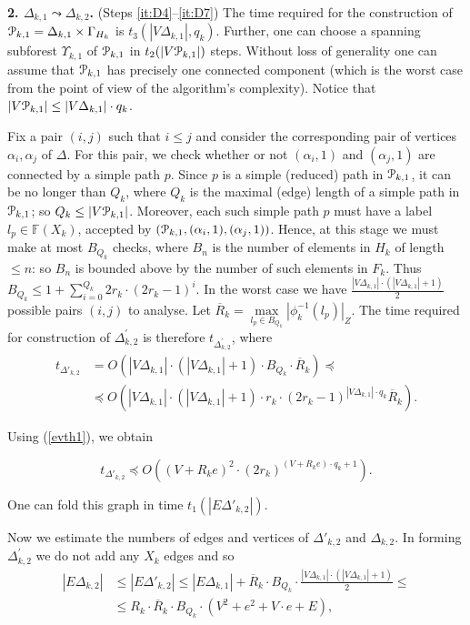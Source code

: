 \documentclass[a4paper,12pt]{article}
\renewcommand{\a}{\alpha }
\newcommand{\G}{\Gamma }
\newcommand{\D}{\Delta }
\newcommand{\U}{\Upsilon }
\newcommand{\cP}{{\cal{P}}}
\numberwithin{equation}{section}
\numberwithin{figure}{section}
\newcommand{\FF}{\ensuremath{\mathbb{F}}}
\begin{document}
{\bf 2. $\D_{k,1} \leadsto \D_{k,2}$.}  (Steps \ref{it:D4}--\ref{it:D7}) The time required for the
construction of $\cP_{k,1}=\D_{k,1}\times \G_{H_k}$ is $t_3(|V \D_{k,1}|, q_k)$.
Further, one can choose a spanning subforest $\U_{k,1}$ of $\cP_{k,1}$ in
$t_2(|V\cP_{k,1}|)$ steps. Without loss of generality one can assume
that $\cP_{k,1}$ has precisely one connected component (which is the
worst case from the point of view of the algorithm's complexity).
Notice that $|V\cP_{k,1}| \le |V\D_{k,1}|\cdot q_k$.


Fix a pair $(i, j)$ such that $i \le j$ and consider the
corresponding pair of vertices $\a_i,\a_j$ of $\D$. For this pair, we check
whether or not $(\a_i,1)$ and $(\a_j,1)$ are
connected by a  simple path $p$.
Since $p$ is a
simple (reduced) path in $\cP_{k,1}$, it can be no longer than $Q_k$,
where $Q_k$ is the maximal (edge) length of a simple path in $\cP_{k,1}$;
so $Q_k \le |V\cP_{k,1}|$.
Moreover, each such  simple path $p$ must have a label $l_p \in \FF(X_k)$,
accepted by $(\cP_{k,1},(\a_i,1),(\a_j,1))$. Hence, at
 this stage we must make
at most $B_{Q_k}$ checks, where $B_n$ is the number of elements in
$H_k$ of length $\le n$: so $B_{n}$ is bounded above by the number
of such elements in $F_k$. Thus $B_{Q_k} \le 1+
\mathop{\sum}\limits_{i=0}^{Q_k} 2 r_k \cdot (2r_k-1)^{i}$. In the
worst case we have $\frac{|V\D_{k,1}|\cdot(|V\D_{k,1}|+1)}{2}$ possible
pairs $(i,j)$ to analyse. Let $\overline{R}_k=\max\limits_{l_p \in
B_{Q_k}}|\phi^{-1}_k(l_p)|_Z$.
 The time required for construction of $\D_{k,2}^\prime$ is therefore $t_{\D_{k,2}^\prime}$,
where
\begin{equation}\label{pretheta'2}
\begin{split}
t_{\D'_{k,2}} &= O(|V\D_{k,1}|\cdot(|V\D_{k,1}|+1)\cdot B_{Q_k}
\cdot \overline{R}_k)\preceq\\
&\preceq O(|V\D_{k,1}|\cdot(|V\D_{k,1}|+1)\cdot r_k \cdot
(2r_k-1)^{|V\D_{k,1}|\cdot q_k}\overline{R}_k).
\end{split}
\end{equation}

Using (\ref{evth1}), we obtain

\begin{equation}\label{theta'2}
t_{\D'_{k,2}} \preceq O((V + R_k e)^2\cdot (2r_k)^{(V +
R_k e)\cdot q_k +1}).
\end{equation}

One can fold this graph in time $t_1(|E\D'_{k,2}|)$.

Now we estimate the numbers of edges  and vertices  of $\D'_{k,2}$ and
$\D_{k,2}$. In forming $\D_{k,2}^\prime$  we do not add any $X_k$ edges
and so
\begin{equation}\label{etheta2}
\begin{split}
|E\D_{k,2}| &\le |E\D'_{k,2}| \le |E\D_{k,1}|+\overline{R}_k\cdot B_{Q_k}
\cdot \frac{|V\D_{k,1}|\cdot(|V\D_{k,1}|+1)}{2}\le\\
&\le R_k\cdot 
\overline{R}_k\cdot B_{Q_k} \cdot (V^2 + e^2+V\cdot e+E),
\end{split}
\end{equation}
\end{document}
